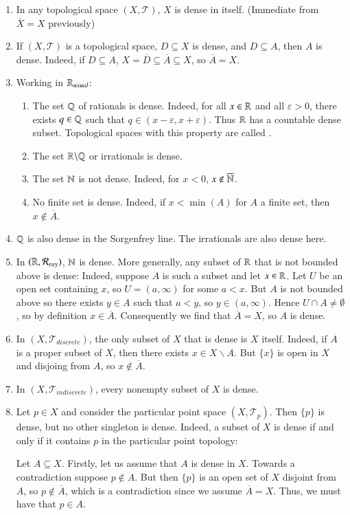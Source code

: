 \documentclass[12pt, a4paper, twoside, openright, titlepage]{book}
\begin{document}
\begin{eg}{}{}
    \leavevmode
    \begin{enumerate}
        \item In any topological space $(X,\mathcal{T})$, $X$ is dense in itself. (Immediate from $\overline{X} = X$ previously)
        \item If $(X,\mathcal{T})$ is a topological space, $D\subseteq X$ is dense, and $D \subseteq A$, then $A$ is dense. Indeed, if $D \subseteq A$, $X = \overline{D} \subseteq \overline{A} \subseteq X$, so $\overline{A} = X$.
        \item Working in $\mathbb R_{usual}$: \begin{enumerate}
                \item The set $\mathbb Q$ of rationals is dense. Indeed, for all $x \in \mathbb R$ and all $\varepsilon > 0$, there exists $q \in \mathbb Q$ such that $q \in (x-\varepsilon,x+\varepsilon)$. Thus $\mathbb R$ has a countable dense subset. Topological spaces with this property are called .
                \item The set $\mathbb R\backslash \mathbb Q$ or irrationals is dense.
                \item The set $\mathbb N$ is not dense. Indeed, for $x < 0$, $x \notin \overline{\mathbb N}$.
                \item No finite set is dense. Indeed, if $x < \min(A)$ for $A$ a finite set, then $x \notin \overline{A}$.
        \end{enumerate}
        \item $\mathbb Q$ is also dense in the Sorgenfrey line. The irrationals are also dense here.
        \item In $(\mathbb R,\mathcal{R}_{ray})$, $\mathbb N$ is dense. More generally, any subset of $\mathbb R$ that is not bounded above is dense: Indeed, suppose $A$ is such a subset and let $x \in \mathbb R$. Let $U$ be an open set containing $x$, so $U = (a,\infty)$ for some $a < x$. But $A$ is not bounded above so there exists $y \in A$ such that $a < y$, so $y \in (a,\infty)$. Hence $U\cap A \neq \emptyset$, so by definition $x \in \overline{A}$. Consequently we find that $\overline{A} = X$, so $A$ is dense.
        \item In $(X,\mathcal{T}_{discrete})$, the only subset of $X$ that is dense is $X$ itself. Indeed, if $A$ is a proper subset of $X$, then there exists $x \in X\backslash A$. But $\{x\}$ is open in $X$ and disjoing from $A$, so $x \notin \overline{A}$.
        \item In $(X,\mathcal{T}_{indiscrete})$, every nonempty subset of $X$ is dense.
        \item Let $p \in X$ and consider the particular point space $(X,\mathcal{T}_p)$. Then $\{p\}$ is dense, but no other singleton is dense. Indeed, a subset of $X$ is dense if and only if it contains $p$ in the particular point topology: \begin{proof*}{}{}
                Let $A \subseteq X$. Firstly, let us assume that $A$ is dense in $X$. Towards a contradiction suppose $p \notin A$. But then $\{p\}$ is an open set of $X$ disjoint from $A$, so $p \notin \overline{A}$, which is a contradiction since we assume $\overline{A} = X$. Thus, we must have that $p \in A$.



\end{proof*}
\end{enumerate}
\end{eg}
\end{document}
